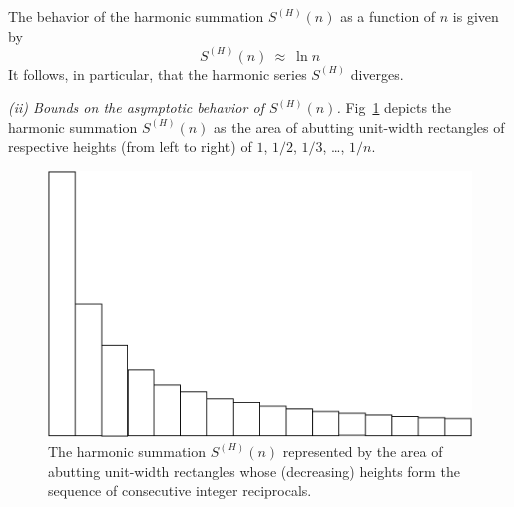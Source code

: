 \begin{prop}
\label{thm:harmonic}
The behavior of the harmonic summation $S^{(H)}(n)$ as a function of $n$ is given by
\[ S^{(H)}(n) \ \approx \ \ln n \]
It follows, in particular, that the harmonic series $S^{(H)}$ diverges.
\end{prop}

\bigskip

\noindent {}
\bigskip


{\it (ii) Bounds on the asymptotic behavior of $S^{(H)}(n)$.}
Fig~\ref{fig:HarmonicSumInitial} depicts the harmonic summation $S^{(H)}(n)$ as the area of abutting unit-width rectangles of respective heights (from left to right) of $1$, $1/2$, $1/3$, \ldots, $1/n$.
\begin{figure}[htb]
\centerline{
\includegraphics[scale=0.2]{FiguresMaths/HarmonicSumInitial}
}
\caption{The harmonic summation $S^{(H)}(n)$ represented by the area of abutting unit-width rectangles whose (decreasing) heights form the sequence of consecutive integer reciprocals.}
\label{fig:HarmonicSumInitial}
\end{figure}

